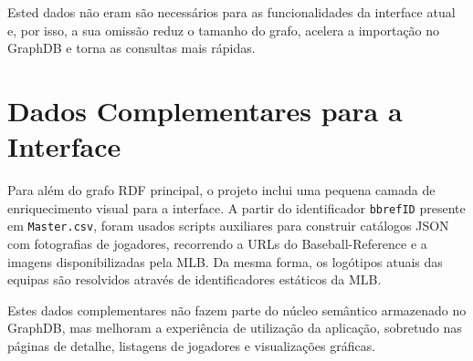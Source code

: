 Ested dados não eram s\~ao necess\'arios para as funcionalidades da interface atual e, por isso, a sua omiss\~ao reduz o tamanho do grafo, acelera a importa\c{c}\~ao no GraphDB e torna as consultas mais rápidas. 


\section{Dados Complementares para a Interface}

Para al\'em do grafo RDF principal, o projeto inclui uma pequena camada de enriquecimento visual para a interface. A partir do identificador \texttt{bbrefID} presente em \texttt{Master.csv}, foram usados scripts auxiliares para construir cat\'alogos JSON com fotografias de jogadores, recorrendo a URLs do Baseball-Reference e a imagens disponibilizadas pela MLB. Da mesma forma, os log\'otipos atuais das equipas s\~ao resolvidos atrav\'es de identificadores est\'aticos da MLB.

Estes dados complementares n\~ao fazem parte do n\'ucleo sem\^antico armazenado no GraphDB, mas melhoram a experi\^encia de utiliza\c{c}\~ao da aplica\c{c}\~ao, sobretudo nas p\'aginas de detalhe, listagens de jogadores e visualiza\c{c}\~oes gr\'aficas.
